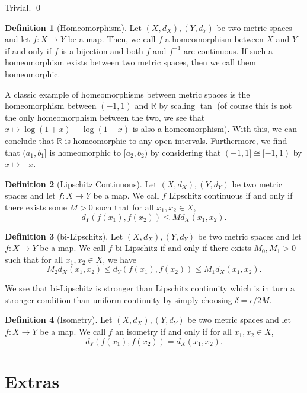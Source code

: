 \documentclass[
]{article}
\theoremstyle{definition}
\newtheorem{definition}{Definition}[section]
\begin{document}
Trivial. \qed

\begin{definition}[Homeomorphism]
  Let \((X, d_X), (Y, d_Y)\) be two metric spaces and let \(f : X \to Y\) be 
  a map. Then, we call \(f\) a homeomorphism between \(X\) and \(Y\) if and only 
  if \(f\) is a bijection and both \(f\) and \(f^{-1}\) are continuous. If such 
  a homeomorphism exists between two metric spaces, then we call them homeomorphic.
\end{definition}

A classic example of homeomorphisms between metric spaces is the
homeomorphism between \((-1, 1)\) and \(\mathbb{R}\) by scaling \(\tan\)
(of course this is not the only homeomorphism between the two, we see
that \(x \mapsto \log(1 + x) - \log(1 - x)\) is also a homeomorphism).
With this, we can conclude that \(\mathbb{R}\) is homeomorphic to any
open intervals. Furthermore, we find that \((a_1, b_1]\) is homeomorphic
to \([a_2, b_2)\) by considering that \((-1, 1] \cong [-1, 1)\) by
\(x \mapsto -x\).

\begin{definition}[Lipschitz Continuous]
  Let \((X, d_X), (Y, d_Y)\) be two metric spaces and let \(f : X \to Y\) be 
  a map. We call \(f\) Lipschitz continuous if and only if there exists some 
  \(M > 0\) such that for all \(x_1, x_2 \in X\), 
  \[d_Y(f(x_1), f(x_2)) \le M d_X(x_1, x_2).\]
\end{definition}

\begin{definition}[bi-Lipschitz]
  Let \((X, d_X), (Y, d_Y)\) be two metric spaces and let \(f : X \to Y\) be 
  a map. We call \(f\) bi-Lipschitz if and only if there exists \(M_0, M_1 > 0\) 
  such that for all \(x_1, x_2 \in X\), we have 
  \[M_2 d_X(x_1, x_2) \le d_Y(f(x_1), f(x_2)) \le M_1 d_X(x_1, x_2).\]
\end{definition}

We see that bi-Lipschitz is stronger than Lipschitz continuity which is
in turn a stronger condition than uniform continuity by simply choosing
\(\delta = \epsilon / 2M\).

\begin{definition}[Isometry]
  Let \((X, d_X), (Y, d_Y)\) be two metric spaces and let \(f : X \to Y\) be 
  a map. We call \(f\) an isometry if and only if for all \(x_1, x_2 \in X\),
  \[d_Y(f(x_1), f(x_2)) = d_X(x_1, x_2).\]
\end{definition}

\hypertarget{extras}{%
\section{Extras}\label{extras}}
\end{document}
